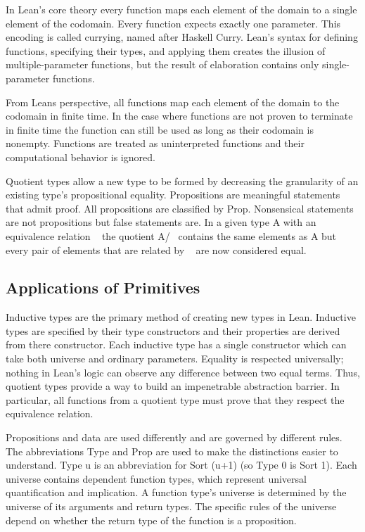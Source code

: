 \documentclass{article}
\newcommand{\1}{\mathbbm{1}}
\theoremstyle{plain}
\theoremstyle{definition}
\numberwithin{equation}{section}
\begin{document}
In Lean’s core theory every function maps each element of the domain to a single element of the codomain. Every function expects exactly one parameter. This encoding is called currying, named after Haskell Curry. Lean's syntax for defining functions, specifying their types, and applying them creates the illusion of multiple-parameter functions, but the result of elaboration contains only single-parameter functions.

From Leans perspective, all functions map each element of the domain to the codomain in finite time. In the case where functions are not proven to terminate in finite time the function can still be used as long as their codomain is nonempty. Functions are treated as uninterpreted functions and their computational behavior is ignored. 

Quotient types allow a new type to be formed by decreasing the granularity of an existing type’s propositional equality. Propositions are meaningful statements that admit proof. All propositions are classified by Prop. Nonsensical statements are not propositions but false statements are. In a given type A with an equivalence relation ~ the quotient A/~ contains the same elements as A but every pair of elements that are related by ~ are now considered equal. 

\subsection{Applications of Primitives}

Inductive types are the primary method of creating new types in Lean. Inductive types are specified by their type constructors and their properties are derived from there constructor. Each inductive type has a single constructor which can take both universe and ordinary parameters. Equality is respected universally; nothing in Lean's logic can observe any difference between two equal terms. Thus, quotient types provide a way to build an impenetrable abstraction barrier. In particular, all functions from a quotient type must prove that they respect the equivalence relation.

Propositions and data are used differently and are governed by different rules. The abbreviations Type and Prop are used to make the distinctions easier to understand. Type u is an abbreviation for Sort (u+1) (so Type 0 is Sort 1). Each universe contains dependent function types, which represent universal quantification and implication. A function type’s universe is determined by the universe of its arguments and return types. The specific rules of the universe depend on whether the return type of the function is a proposition. 
\end{document}
